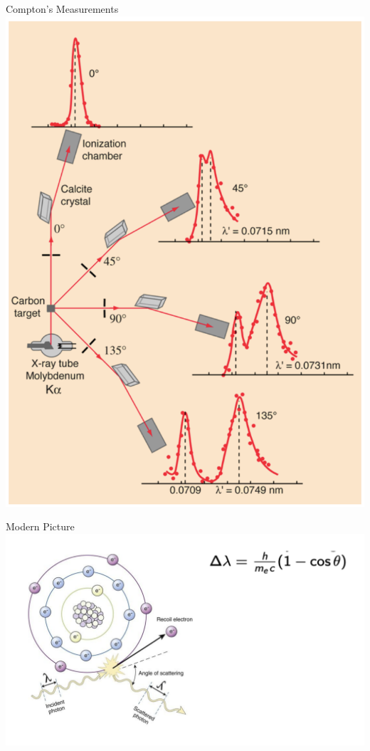 \begin{frame}{Compton's Measurements}
\small
\includegraphics[scale=0.3]{compton2}


\end{frame}


\begin{frame}{Modern Picture}
\small
\includegraphics[scale=0.3]{cartoon}


\end{frame}



